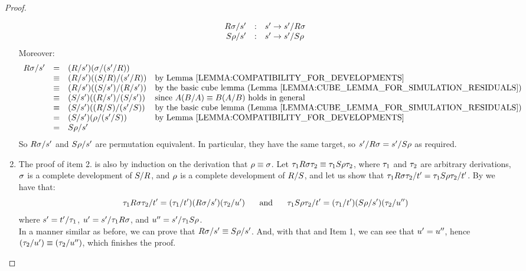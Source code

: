 \begin{proof}
\begin{enumerate}
  \[
    \begin{array}{rcl}
    R\sigma/s' & : & s' \to s'/R\sigma \\
    S\rho/s' & : & s' \to s'/S\rho \\
    \end{array}
  \]
  Moreover:
  \[
    \begin{array}{rcll}
      \redex\redseqtwo/\tmtwo'
    & = & (\redex/\tmtwo')(\redseqtwo/(\tmtwo'/\redex)) \\
    & \permeq & (\redex/\tmtwo')((\redextwo/\redex)/(\tmtwo'/\redex))     & \text{by \rlem{compatibility_for_developments}} \\
    & \permeq & (\redex/\tmtwo')((\redextwo/\tmtwo')/(\redex/\tmtwo'))    & \text{by the basic cube lemma~(\rlem{cube_lemma_for_simulation_residuals})} \\
    & \permeq & (\redextwo/\tmtwo')((\redex/\tmtwo')/(\redextwo/\tmtwo')) & \text{since $A(B/A) \permeq B(A/B)$ holds in general} \\
    & \permeq & (\redextwo/\tmtwo')((\redex/\redextwo)/(\tmtwo'/\redextwo)) & \text{by the basic cube lemma~(\rlem{cube_lemma_for_simulation_residuals})} \\
    & = & (\redextwo/\tmtwo')(\redseq/(\tmtwo'/\redextwo)) & \text{by \rlem{compatibility_for_developments}} \\
    & = & \redextwo\redseq/\tmtwo'
    \end{array}
  \]
  So $R\sigma/s'$ and $S\rho/s'$ are permutation equivalent.
  In particular, they have the same target, so
  $s'/R\sigma = s'/S\rho$ as required.
\item
  The proof of item 2. is also by induction on the derivation that $\rho \equiv \sigma$.
  Let $\tau_1 R \sigma \tau_2 \equiv \tau_1 S \rho \tau_2$,
  where
  $\tau_1$ and $\tau_2$ are arbitrary derivations,
  $\sigma$ is a complete development of $S/R$,
  and $\rho$ is a complete development of $R/S$,
  and let us show that $\tau_1 R \sigma \tau_2/t' = \tau_1 S \rho \tau_2/t'$.
  By  we have that:
  \[
    \tau_1 R \sigma \tau_2/t' = (\tau_1/t') (R \sigma/s') (\tau_2/u')
    \hspace{.5cm}
    \text{ and }
    \hspace{.5cm}
    \tau_1 S \rho \tau_2 / t'= (\tau_1 / t') (S \rho/s') (\tau_2/u'')
  \]
  where $s' = t'/\tau_1$,
        $u' = s'/\tau_1R\sigma$,
        and
        $u'' = s'/\tau_1S\rho$.
  \\
  In a manner similar as before, we can prove that $R\sigma/s' \equiv S\rho/s'$.
  And, with that and Item 1, we can see that $u' = u''$,
  hence $(\tau_2/u') \equiv (\tau_2/u'')$,
  which finishes the proof.
\end{enumerate}
\end{proof}
